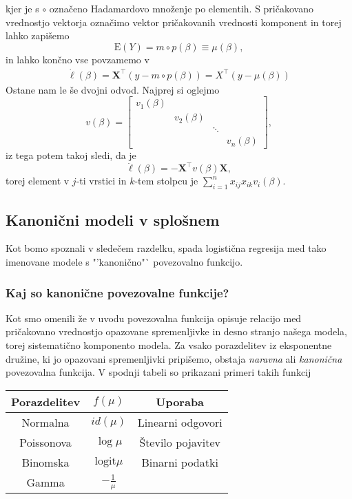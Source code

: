 \documentclass[12pt,a4paper]{amsart}
\theoremstyle{definition} %
\theoremstyle{plain} %
\begin{document}
kjer je s $\circ$ označeno Hadamardovo množenje po elementih.
S pričakovano vrednostjo vektorja označimo vektor pričakovanih vrednosti komponent in torej lahko zapišemo
\begin{equation}
    \mathrm{E}(Y) = m \circ p(\beta) \equiv \mu(\beta),
\end{equation}
in lahko končno vse povzamemo v
\begin{align}\label{prvi}
    \dot{\ell}(\beta) = \mathbf{X}^\top(y - m \circ p(\beta)) = X^\top(y - \mu(\beta))
\end{align}
Ostane nam le še dvojni odvod. Najprej si oglejmo
\[
    v(\beta) = \begin{bmatrix}
        v_{1}(\beta)  & & &\\
        & v_{2}(\beta) & & \\
        & & \ddots & \\
        & & & v_{n}(\beta)
    \end{bmatrix},
\]
iz tega potem takoj sledi, da je
\begin{equation} \label{drugi}
    \ddot{\ell}(\beta) = -\mathbf{X}^\top v(\beta)\mathbf{X},
\end{equation}
torej element v $j$-ti vrstici in $k$-tem stolpcu je $\sum_{i=1}^{n}x_{ij}x_{ik}v_{i}(\beta).$

\subsection{Kanonični modeli v splošnem}
Kot bomo spoznali v sledečem razdelku, spada logistična regresija med tako imenovane modele s "'kanonično"` povezovalno funkcijo. 

\subsubsection{Kaj so kanonične povezovalne funkcije?}
Kot smo omenili že v uvodu povezovalna funkcija opisuje relacijo med pričakovano vrednostjo opazovane spremenljivke in desno stranjo našega modela, torej
sistematično komponento modela. Za vsako porazdelitev iz eksponentne družine, ki jo opazovani spremenljivki pripišemo, obstaja \textit{naravna} ali \textit{kanonična}
povezovalna funkcija. V spodnji tabeli so prikazani primeri takih funkcij

\begin{center}
    \begin{tabular}{ | c | c | c |}
        \hline
        Porazdelitev & $f(\mu)$ & Uporaba \\
        \hline
        Normalna & $id(\mu)$ &  Linearni odgovori\\
        Poissonova & $\log \mu$ & Število pojavitev \\
        Binomska & $\mathrm{logit}\mu$ & Binarni podatki\\
        Gamma & $-\frac{1}{\mu}$ & \\
        \hline
    \end{tabular}
\end{center}
\end{document}
